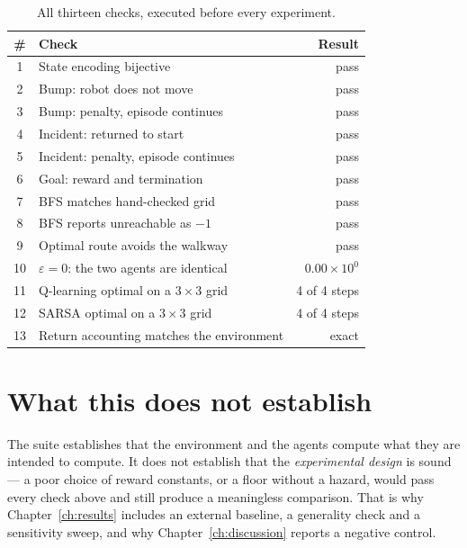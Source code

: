 \begin{table}[ht]
\centering
\caption[Verification results]{All thirteen checks, executed before every experiment.}
\label{tab:verification}
\begin{tabular}{clr}
\toprule
\textbf{\#} & \textbf{Check} & \textbf{Result} \\
\midrule
1  & State encoding bijective                   & pass \\
2  & Bump: robot does not move                  & pass \\
3  & Bump: penalty, episode continues           & pass \\
4  & Incident: returned to start                & pass \\
5  & Incident: penalty, episode continues       & pass \\
6  & Goal: reward and termination               & pass \\
7  & BFS matches hand-checked grid              & pass \\
8  & BFS reports unreachable as $-1$            & pass \\
9  & Optimal route avoids the walkway           & pass \\
10 & $\varepsilon=0$: the two agents are identical & $0.00\times10^{0}$ \\
11 & Q-learning optimal on a $3\times3$ grid    & 4 of 4 steps \\
12 & SARSA optimal on a $3\times3$ grid         & 4 of 4 steps \\
13 & Return accounting matches the environment  & exact \\
\bottomrule
\end{tabular}
\end{table}

\section{What this does not establish}

The suite establishes that the environment and the agents compute what they are intended to
compute. It does not establish that the \emph{experimental design} is sound --- a poor choice of
reward constants, or a floor without a hazard, would pass every check above and still produce a
meaningless comparison. That is why Chapter~\ref{ch:results} includes an external baseline, a
generality check and a sensitivity sweep, and why Chapter~\ref{ch:discussion} reports a negative
control.
